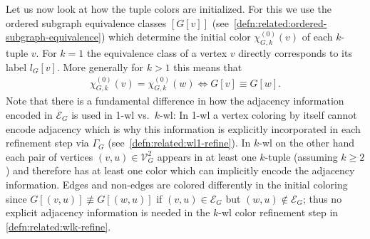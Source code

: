 Let us now look at how the tuple colors are initialized.
For this we use the ordered subgraph equivalence classes $[G[v]]$ (see~\cref{defn:related:ordered-subgraph-equivalence}) which determine the initial color $\chi_{G,k}^{(0)}(v)$ of each $k$-tuple $v$.
For $k = 1$ the equivalence class of a vertex $v$ directly corresponds to its label $l_G[v]$.
More generally for $k > 1$ this means that
\begin{align}
	\chi_{G,k}^{(0)}(v) = \chi_{G,k}^{(0)}(w) \iff G[v] \equiv G[w] \text{.} \label{eq:related:wlk-init}
\end{align}
Note that there is a fundamental difference in how the adjacency information encoded in $\mathcal{E}_G$ is used in 1-\acs{wl} vs.\ $k$-\acs{wl}:
In 1-\acs{wl} a vertex coloring by itself cannot encode adjacency which is why this information is explicitly incorporated in each refinement step via $\Gamma_G$ (see~\cref{defn:related:wl1-refine}).
In $k$-\acs{wl} on the other hand each pair of vertices $(v, u) \in \mathcal{V}_G^2$ appears in at least one $k$-tuple (assuming $k \geq 2$) and therefore has at least one color which can implicitly encode the adjacency information.
Edges and non-edges are colored differently in the initial coloring since $G[(v, u)] \not\equiv G[(w, u)]$ if $(v, u) \in \mathcal{E}_G$ but $(w, u) \notin \mathcal{E}_G$;
thus no explicit adjacency information is needed in the $k$-\acs{wl} color refinement step in \cref{defn:related:wlk-refine}.


